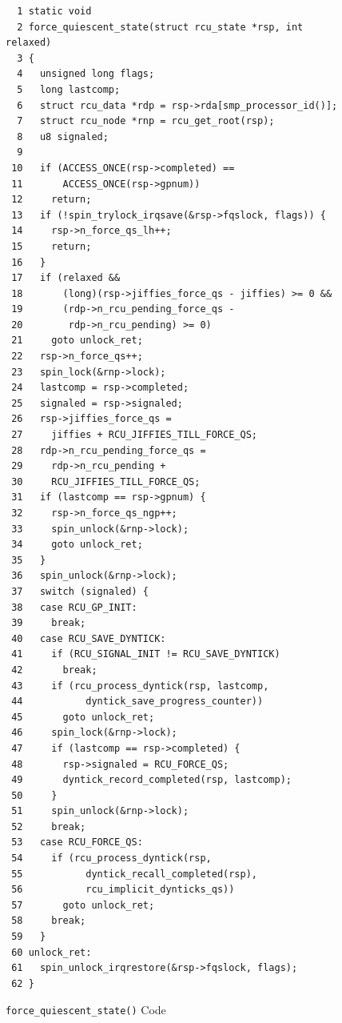 

\begin{figure}[tbp]
{ \scriptsize
\begin{verbatim}
  1 static void
  2 force_quiescent_state(struct rcu_state *rsp, int relaxed)
  3 {
  4   unsigned long flags;
  5   long lastcomp;
  6   struct rcu_data *rdp = rsp->rda[smp_processor_id()];
  7   struct rcu_node *rnp = rcu_get_root(rsp);
  8   u8 signaled;
  9 
 10   if (ACCESS_ONCE(rsp->completed) ==
 11       ACCESS_ONCE(rsp->gpnum))
 12     return;
 13   if (!spin_trylock_irqsave(&rsp->fqslock, flags)) {
 14     rsp->n_force_qs_lh++;
 15     return;
 16   }
 17   if (relaxed &&
 18       (long)(rsp->jiffies_force_qs - jiffies) >= 0 &&
 19       (rdp->n_rcu_pending_force_qs -
 20        rdp->n_rcu_pending) >= 0)
 21     goto unlock_ret;
 22   rsp->n_force_qs++;
 23   spin_lock(&rnp->lock);
 24   lastcomp = rsp->completed;
 25   signaled = rsp->signaled;
 26   rsp->jiffies_force_qs =
 27     jiffies + RCU_JIFFIES_TILL_FORCE_QS;
 28   rdp->n_rcu_pending_force_qs =
 29     rdp->n_rcu_pending +
 30     RCU_JIFFIES_TILL_FORCE_QS;
 31   if (lastcomp == rsp->gpnum) {
 32     rsp->n_force_qs_ngp++;
 33     spin_unlock(&rnp->lock);
 34     goto unlock_ret;
 35   }
 36   spin_unlock(&rnp->lock);
 37   switch (signaled) {
 38   case RCU_GP_INIT:
 39     break;
 40   case RCU_SAVE_DYNTICK:
 41     if (RCU_SIGNAL_INIT != RCU_SAVE_DYNTICK)
 42       break;
 43     if (rcu_process_dyntick(rsp, lastcomp,
 44           dyntick_save_progress_counter))
 45       goto unlock_ret;
 46     spin_lock(&rnp->lock);
 47     if (lastcomp == rsp->completed) {
 48       rsp->signaled = RCU_FORCE_QS;
 49       dyntick_record_completed(rsp, lastcomp);
 50     }
 51     spin_unlock(&rnp->lock);
 52     break;
 53   case RCU_FORCE_QS:
 54     if (rcu_process_dyntick(rsp,
 55           dyntick_recall_completed(rsp),
 56           rcu_implicit_dynticks_qs))
 57       goto unlock_ret;
 58     break;
 59   }
 60 unlock_ret:
 61   spin_unlock_irqrestore(&rsp->fqslock, flags);
 62 }
\end{verbatim}
}
\caption{{\tt force\_quiescent\_state()} Code}
\label{fig:app:rcuimpl:rcutreewt:Code for rcutree force-quiescent-state}
\end{figure}

